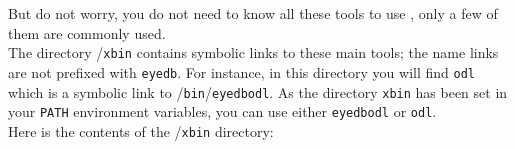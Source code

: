 \begin{tabbing}

\end{tabbing}
But do not worry, you do not need to know all these tools to use
\eyedbX, only a few of them are commonly used.
\\
The directory {\EYEDBARCH}/\texttt{xbin} contains symbolic links to 
these main tools; the name links are not prefixed with \texttt{eyedb}.
For instance, in this directory
you will find \texttt{odl} which is a symbolic link to {\EYEDBARCH}/\texttt{bin}/\texttt{eyedbodl}. As the directory \texttt{xbin} has been set in
your \texttt{PATH} environment variables, you can use either \texttt{eyedbodl}
or \texttt{odl}.
\\
Here is the contents of the {\EYEDBARCH}/\texttt{xbin} directory:
